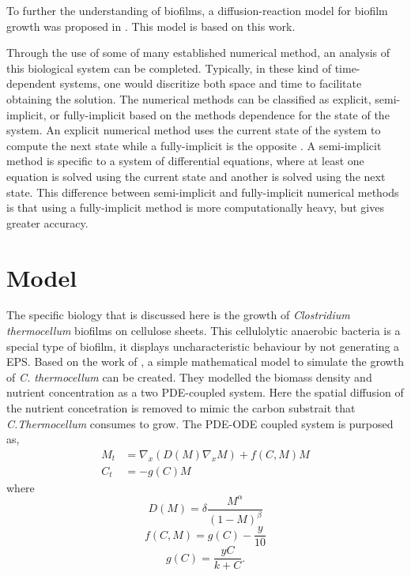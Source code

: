 \documentclass{llncs}
\begin{document}
  To further the understanding of biofilms, a diffusion-reaction model for biofilm growth was proposed in \cite{eberl2001deterministic}.
  This model is based on this work.
  
  Through the use of some of many established numerical method, an analysis of this biological system can be completed.
  Typically, in these kind of time-dependent systems, one would discritize both space and time to facilitate obtaining the solution. 
  The numerical methods can be classified as explicit, semi-implicit, or fully-implicit based on the methods dependence for the state of the system.
  An explicit numerical method uses the current state of the system to compute the next state while a fully-implicit is the opposite \cite{butcher2008methods}.
  A semi-implicit method is specific to a system of differential equations, where at least one equation is solved using the current state and another is solved using the next state. 
  This difference between semi-implicit and fully-implicit numerical methods is that using a fully-implicit method is more computationally heavy, but gives greater accuracy.

  

\section{Model}
  The specific biology that is discussed here is the growth of \textit{Clostridium thermocellum} biofilms on cellulose sheets.
  This cellulolytic anaerobic bacteria is a special type of biofilm, it displays uncharacteristic behaviour by not generating a EPS.
  Based on the work of \cite{dumitrache2014understanding}, a simple mathematical model to simulate the growth of \textit{C. thermocellum} can be created.
  They modelled the biomass density and nutrient concentration as a two PDE-coupled system. 
  Here the spatial diffusion of the nutrient concetration is removed to mimic the carbon substrait that \textit{C.Thermocellum} consumes to grow. 
  The PDE-ODE coupled system is purposed as,
  \begin{align} 
     M_t &= \nabla_x \left(  {D}(M) \nabla_x M \right) + {f}({C},M) M \label{equ:model_M}\\
     {C}_t &= -{g}({C}) M \label{equ:model_C}
  \end{align}
  where
  \begin{equation} \label{equ:model_D}
    {D}(M) = {\delta} \frac{M^\alpha}{(1-M)^\beta}
  \end{equation}
  \begin{equation} \label{equ:model_f}
    {f}({C},M) = {g}({C}) - \frac{y}{10} 
  \end{equation}
  \begin{equation} \label{equ:model_g}
    {g}({C}) = \frac{{y} {C}}{{k} + {C}}.
  \end{equation}
  
\end{document}
